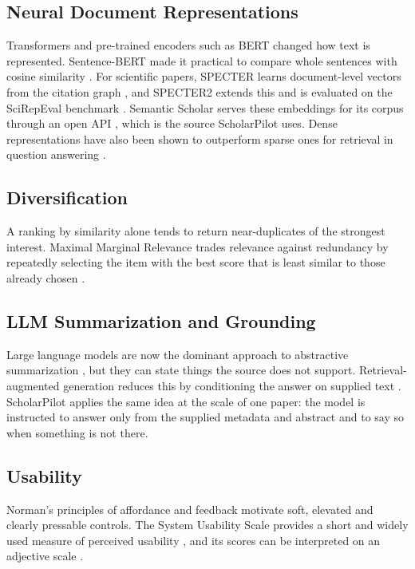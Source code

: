 \documentclass[conference]{IEEEtran}
\begin{document}
\subsection{Neural Document Representations}
Transformers \cite{vaswani2017} and pre-trained encoders such as BERT \cite{devlin2019} changed how text is represented. Sentence-BERT made it practical to compare whole sentences with cosine similarity \cite{reimers2019}. For scientific papers, SPECTER learns document-level vectors from the citation graph \cite{cohan2020}, and SPECTER2 extends this and is evaluated on the SciRepEval benchmark \cite{singh2023}. Semantic Scholar serves these embeddings for its corpus through an open API \cite{kinney2023}, which is the source ScholarPilot uses. Dense representations have also been shown to outperform sparse ones for retrieval in question answering \cite{karpukhin2020}.

\subsection{Diversification}
A ranking by similarity alone tends to return near-duplicates of the strongest interest. Maximal Marginal Relevance trades relevance against redundancy by repeatedly selecting the item with the best score that is least similar to those already chosen \cite{carbonell1998}.

\subsection{LLM Summarization and Grounding}
Large language models are now the dominant approach to abstractive summarization \cite{zhang2024}, but they can state things the source does not support. Retrieval-augmented generation reduces this by conditioning the answer on supplied text \cite{lewis2020,gao2023}. ScholarPilot applies the same idea at the scale of one paper: the model is instructed to answer only from the supplied metadata and abstract and to say so when something is not there.

\subsection{Usability}
Norman's principles of affordance and feedback \cite{norman2013} motivate soft, elevated and clearly pressable controls. The System Usability Scale provides a short and widely used measure of perceived usability \cite{brooke1996}, and its scores can be interpreted on an adjective scale \cite{bangor2008}.
\end{document}
